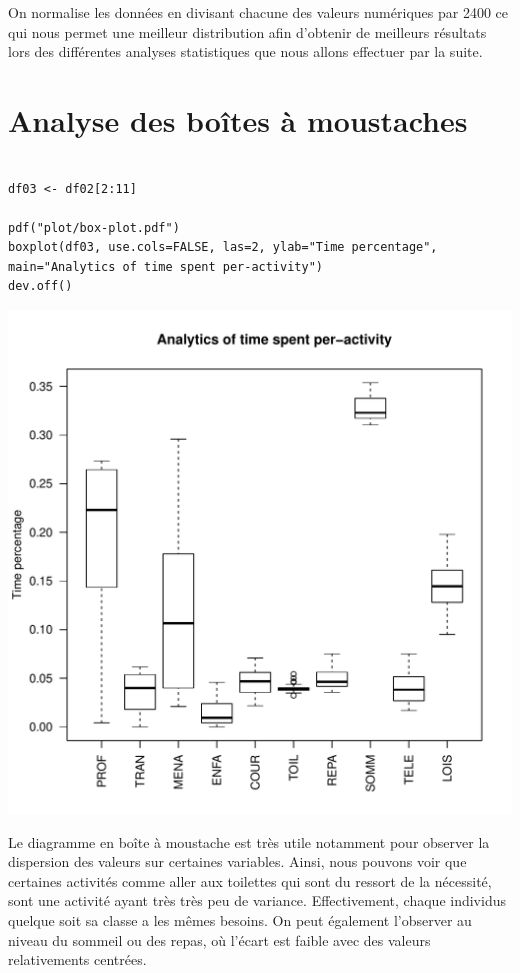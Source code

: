 \documentclass[11pt]{article}
\begin{document}
On normalise les données en divisant chacune des valeurs numériques par 2400 ce qui nous permet une meilleur distribution afin d'obtenir de meilleurs résultats lors des différentes analyses statistiques que nous allons effectuer par la suite.

\newpage

\section{Analyse des boîtes à moustaches}
\begin{verbatim}

df03 <- df02[2:11]

pdf("plot/box-plot.pdf")
boxplot(df03, use.cols=FALSE, las=2, ylab="Time percentage", main="Analytics of time spent per-activity")
dev.off()

\end{verbatim}

\includegraphics[scale=0.8]{../plot/box-plot.pdf}

Le diagramme en boîte à moustache est très utile notamment pour observer la dispersion des valeurs sur certaines variables. Ainsi, nous pouvons voir que certaines activités comme aller aux toilettes qui sont du ressort de la nécessité, sont une activité ayant très très peu de variance. Effectivement, chaque individus quelque soit sa classe a les mêmes besoins. On peut également l'observer au niveau du sommeil ou des repas, où l'écart est faible avec des valeurs relativements centrées.
\end{document}
